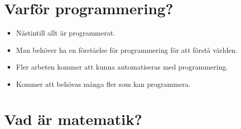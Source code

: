 

\section{Varför programmering?}

\begin{frame}
  \begin{example}[Förståelse]
    \begin{itemize}
      \item Nästintill allt är programmerat.
      \item Man behöver ha en förståelse för programmering för att förstå 
        världen.
    \end{itemize}
  \end{example}

  \begin{example}[Arbete]
    \begin{itemize}
      \item Fler arbeten kommer att kunna automatiseras med programmering.
      \item Kommer att behövas många fler som kan programmera.
    \end{itemize}
  \end{example}
\end{frame}

\section{Vad är matematik?}


